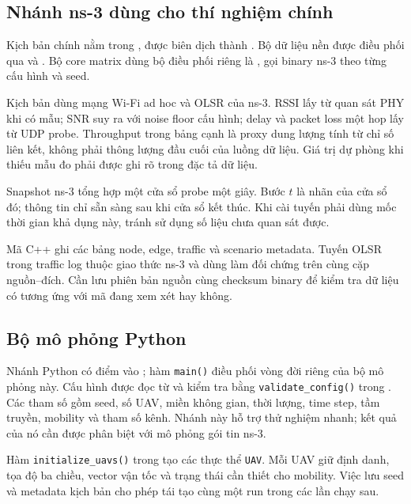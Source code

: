 \documentclass[12pt,a4paper]{article}
\newcommand{\code}[1]{{\small\texttt{#1}}}
\begin{document}
\subsection{Nhánh ns-3 dùng cho thí nghiệm chính}

Kịch bản chính nằm trong , được biên dịch thành . Bộ dữ liệu nền được điều phối qua  và . Bộ core matrix dùng bộ điều phối riêng là , gọi binary ns-3 theo từng cấu hình và seed.

Kịch bản dùng mạng Wi-Fi ad hoc và OLSR của ns-3. RSSI lấy từ quan sát PHY khi có mẫu; SNR suy ra với noise floor cấu hình; delay và packet loss một hop lấy từ UDP probe. Throughput trong bảng cạnh là proxy dung lượng tính từ chỉ số liên kết, không phải thông lượng đầu cuối của luồng dữ liệu. Giá trị dự phòng khi thiếu mẫu đo phải được ghi rõ trong đặc tả dữ liệu.

Snapshot ns-3 tổng hợp một cửa sổ probe một giây. Bước \(t\) là nhãn của cửa sổ đó; thông tin chỉ sẵn sàng sau khi cửa sổ kết thúc. Khi cài tuyến phải dùng mốc thời gian khả dụng này, tránh sử dụng số liệu chưa quan sát được.

Mã C++ ghi các bảng node, edge, traffic và scenario metadata. Tuyến OLSR trong traffic log thuộc giao thức ns-3 và dùng làm đối chứng trên cùng cặp nguồn--đích. Cần lưu phiên bản nguồn cùng checksum binary để kiểm tra dữ liệu có tương ứng với mã đang xem xét hay không.

\subsection{Bộ mô phỏng Python}

Nhánh Python có điểm vào ; hàm \code{main()} điều phối vòng đời riêng của bộ mô phỏng này. Cấu hình được đọc từ  và kiểm tra bằng \code{validate\_config()} trong . Các tham số gồm seed, số UAV, miền không gian, thời lượng, time step, tầm truyền, mobility và tham số kênh. Nhánh này hỗ trợ thử nghiệm nhanh; kết quả của nó cần được phân biệt với mô phỏng gói tin ns-3.

Hàm \code{initialize\_uavs()} trong  tạo các thực thể \code{UAV}. Mỗi UAV giữ định danh, tọa độ ba chiều, vector vận tốc và trạng thái cần thiết cho mobility. Việc lưu seed và metadata kịch bản cho phép tái tạo cùng một run trong các lần chạy sau.
\end{document}
